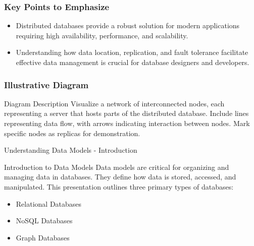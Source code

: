\documentclass[aspectratio=169]{beamer}
\begin{document}
\begin{frame}[fragile]
    \frametitle{Key Points to Emphasize}
    \begin{itemize}
        \item Distributed databases provide a robust solution for modern applications requiring high availability, performance, and scalability.
        \item Understanding how data location, replication, and fault tolerance facilitate effective data management is crucial for database designers and developers.
    \end{itemize}
\end{frame}

\begin{frame}[fragile]
    \frametitle{Illustrative Diagram}
    \begin{block}{Diagram Description}
        Visualize a network of interconnected nodes, each representing a server that hosts parts of the distributed database. Include lines representing data flow, with arrows indicating interaction between nodes. Mark specific nodes as replicas for demonstration.
    \end{block}
\end{frame}

\begin{frame}[fragile]{Understanding Data Models - Introduction}
    \begin{block}{Introduction to Data Models}
        Data models are critical for organizing and managing data in databases. They define how data is stored, accessed, and manipulated. This presentation outlines three primary types of databases:
        \begin{itemize}
            \item Relational Databases
            \item NoSQL Databases
            \item Graph Databases
        \end{itemize}
    \end{block}
\end{frame}
\end{document}

